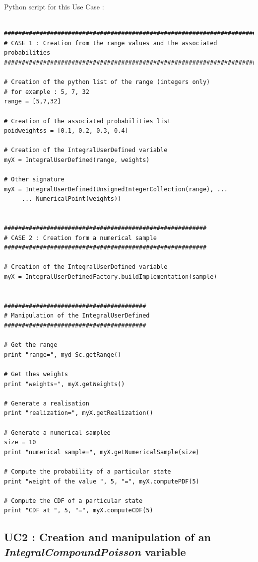 \espace
Python  script for this Use Case :
\begin{lstlisting}

##############################################################################
# CASE 1 : Creation from the range values and the associated probabilities
##############################################################################

# Creation of the python list of the range (integers only)
# for example : 5, 7, 32
range = [5,7,32]

# Creation of the associated probabilities list
poidweightss = [0.1, 0.2, 0.3, 0.4]

# Creation of the IntegralUserDefined variable
myX = IntegralUserDefined(range, weights)

# Other signature
myX = IntegralUserDefined(UnsignedIntegerCollection(range), ...
     ... NumericalPoint(weights))


#########################################################
# CASE 2 : Creation form a numerical sample
#########################################################

# Creation of the IntegralUserDefined variable
myX = IntegralUserDefinedFactory.buildImplementation(sample)


########################################
# Manipulation of the IntegralUserDefined
########################################

# Get the range
print "range=", myd_Sc.getRange()

# Get thes weights 
print "weights=", myX.getWeights()

# Generate a realisation
print "realization=", myX.getRealization()

# Generate a numerical samplee
size = 10
print "numerical sample=", myX.getNumericalSample(size)

# Compute the probability of a particular state
print "weight of the value ", 5, "=", myX.computePDF(5)

# Compute the CDF of a particular state 
print "CDF at ", 5, "=", myX.computeCDF(5)
\end{lstlisting}




\subsection{UC2 : Creation and manipulation of an  {\itshape IntegralCompoundPoisson} variable}



